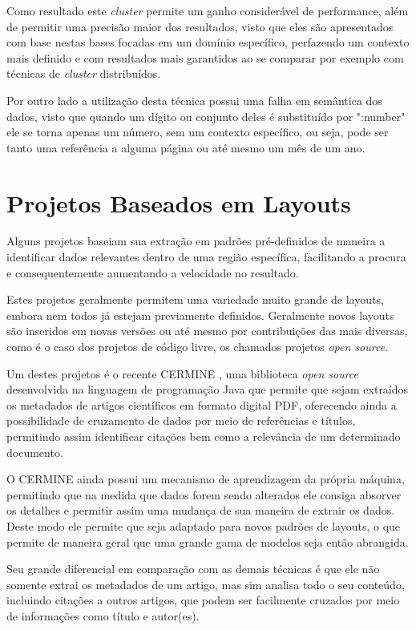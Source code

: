 \documentclass[
	12pt,               %
	openright,          %
	twoside,            %
	a4paper,            %
	english,            %
	brazil              %
	]{abntex2}
\begin{document}
Como resultado este \textit{cluster} permite um ganho considerável de performance, além de permitir uma precisão maior dos resultados, visto que eles são apresentados com base nestas bases focadas em um domínio específico, perfazendo um contexto mais definido e com resultados mais garantidos ao se comparar por exemplo com técnicas de \textit{cluster} distribuídos.

Por outro lado a utilização desta técnica possui uma falha em semântica dos dados, visto que quando um dígito ou conjunto deles é substituído por ":number" ele se torna apenas um número, sem um contexto específico, ou seja, pode ser tanto uma referência a alguma página ou até mesmo um mês de um ano.

\section{Projetos Baseados em Layouts}

Alguns projetos baseiam sua extração em padrões pré-definidos de maneira a identificar dados relevantes dentro de uma região específica, facilitando a procura e consequentemente aumentando a velocidade no resultado. 

Estes projetos geralmente permitem uma variedade muito grande de layouts, embora nem todos já estejam previamente definidos. Geralmente novos layouts são inseridos em novas versões ou até mesmo por contribuições das mais diversas, como é o caso dos projetos de código livre, os chamados projetos \textit{open source}.


Um destes projetos é o recente CERMINE \cite{cermine}, uma biblioteca \textit{open source} desenvolvida na linguagem de programação Java que permite que sejam extraídos os metadados de artigos científicos em formato digital PDF, oferecendo ainda a possibilidade de cruzamento de dados por meio de referências e títulos, permitindo assim identificar citações bem como a relevância de um determinado documento.

O CERMINE ainda possui um mecanismo de aprendizagem da própria máquina, permitindo que na medida que dados forem sendo alterados ele consiga absorver os detalhes e permitir assim uma mudança de sua maneira de extrair os dados. Deste modo ele permite que seja adaptado para novos padrões de layouts, o que permite de maneira geral que uma grande gama de modelos seja então abrangida. 

Seu grande diferencial em comparação com as demais técnicas é que ele não somente extrai os metadados de um artigo, mas sim analisa todo o seu conteúdo, incluindo citações a outros artigos, que podem ser facilmente cruzados por meio de informações como título e autor(es).
\end{document}
